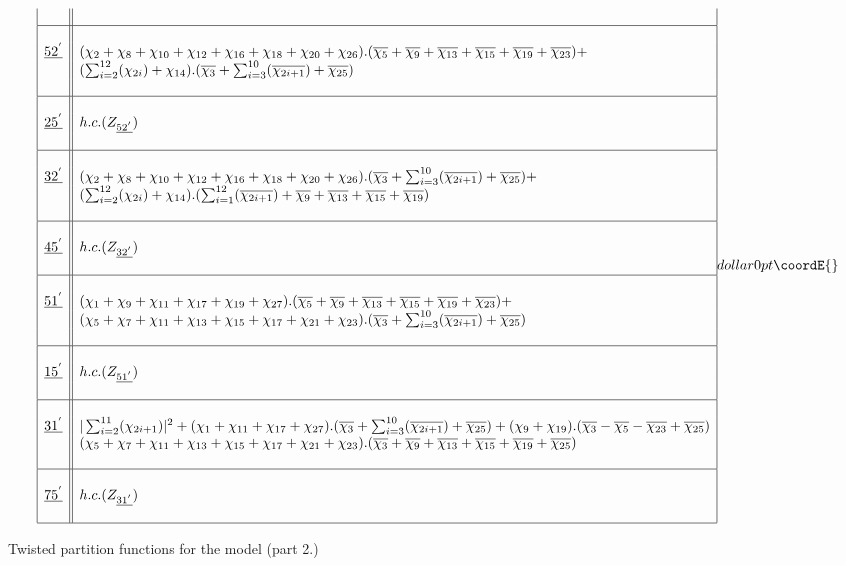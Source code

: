 \documentclass[a4paper,11pt]{article}
\providecommand{\ch}[1]{\chi_{#1}}
\providecommand{\och}[1]{\overline{\chi_{#1}}}
\providecommand{\ud}[1]{\underline{#1}}
\begin{document}
\begin{table}
$${\begin{array}{|c||l|}
{}  & {} \\
\hline
{}  & {} \\
\ud{52^{'}}  & (\ch{2} + \ch{8} + \ch{10} + \ch{12} + \ch{16} +
\ch{18} + \ch{20}+ \ch{26}).(\och{5} + \och{9} + \och{13} + \och{15}
+ \och{19} + \och{23}) + \\
{}  & (\sum_{i=2}^{12}(\ch{2i}) + \ch{14}).(\och{3} +
\sum_{i=3}^{10}(\och{2i+1}) + \och{25}) \\
{}  & {} \\
\hline
{}  & {} \\
\ud{25^{'}}  & h.c.(Z_{\ud{52^{'}}}) \\
{}  & {} \\
\hline
{}  & {} \\
\ud{32^{'}}  & (\ch{2} + \ch{8} + \ch{10} + \ch{12} + \ch{16} +
\ch{18} + \ch{20}+ \ch{26}).(\och{3} + \sum_{i=3}^{10}(\och{2i+1}) +
\och{25})+  \\
{}  & (\sum_{i=2}^{12}(\ch{2i}) +
\ch{14}).(\sum_{i=1}^{12}(\och{2i+1}) + \och{9} + \och{13} + \och{15}
+ \och{19}) \\
{}  & {} \\
\hline
{}  & {} \\
\ud{45^{'}}  & h.c.(Z_{\ud{32^{'}}}) \\
{}  & {} \\
\hline
{}  & {} \\
\ud{51^{'}}  & (\ch{1} + \ch{9} + \ch{11} + \ch{17} + \ch{19} +
\ch{27}).(\och{5} + \och{9} + \och{13} + \och{15} + \och{19} +
\och{23}) + \\
{}  & (\ch{5} + \ch{7} + \ch{11} + \ch{13} + \ch{15} + \ch{17} +
\ch{21}+ \ch{23}).(\och{3} + \sum_{i=3}^{10}(\och{2i+1}) + \och{25})
\\
{}  & {} \\
\hline
{}  & {} \\
\ud{15^{'}}  & h.c.(Z_{\ud{51^{'}}}) \\
{}  & {} \\
\hline
{}  & {} \\
\ud{31^{'}}  & |\sum_{i=2}^{11}(\ch{2i+1})|^2 + (\ch{1} + \ch{11} +
\ch{17} + \ch{27}).(\och{3} + \sum_{i=3}^{10}(\och{2i+1}) + \och{25})
+ (\ch{9} + \ch{19}) .(\och{3} - \och{5} - \och{23} + \och{25})\\
{}  & (\ch{5} + \ch{7} + \ch{11} + \ch{13} + \ch{15} + \ch{17} +
\ch{21}+ \ch{23}).(\och{3} + \och{9} + \och{13} + \och{15} + \och{19}
+ \och{25}) \\
{}  & {} \\
\hline
{}  & {} \\
\ud{75^{'}}  & h.c.(Z_{\ud{31^{'}}}) \\
{}  & {} \\
\hline
\end{array}
}{dollar}{0pt}\coordE{}$$
\normalsize
\caption{Twisted partition functions for the \coordHE{} model (part 2.)}
\end{table}
\end{document}
